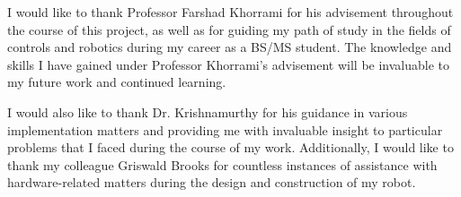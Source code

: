 \clearpage
\vspace*{\fill}
	\begin{center}
		\begin{minipage}{\textwidth}
			I would like to thank Professor Farshad Khorrami for his advisement throughout the course of this project, as well as for guiding my path of study in the fields of controls and robotics during my career as a BS/MS student. The knowledge and skills I have gained under Professor Khorrami's advisement will be invaluable to my future work and continued learning. %
			
			\vspace{5mm}
			\hspace{5mm} 
			I would also like to thank Dr. Krishnamurthy for his guidance in various implementation matters and providing me with invaluable insight to particular problems that I faced during the course of my work. Additionally, I would like to thank my colleague Griswald Brooks for countless instances of assistance with hardware-related matters during the design and construction of my robot. 
		\end{minipage}
	\end{center}
\vfill %
\clearpage
